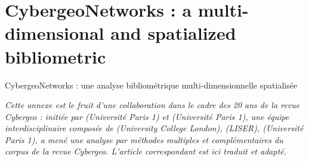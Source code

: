 


\newpage


\section{CybergeoNetworks : a multi-dimensional and spatialized bibliometric}{CybergeoNetworks : une analyse bibliométrique multi-dimensionnelle spatialisée}

\label{app:sec:cybergeonetworks}


\stars


\textit{Cette annexe est le fruit d'une collaboration dans le cadre des 20 ans de la revue Cybergeo : initiée par  (Université Paris 1) et  (Université Paris 1), une équipe interdisciplinaire composée de  (University College London),  (LISER),  (Université Paris 1), a mené une analyse par méthodes multiples et complémentaires du corpus de la revue Cybergeo. L'article correspondant est ici traduit et adapté.}


\stars



